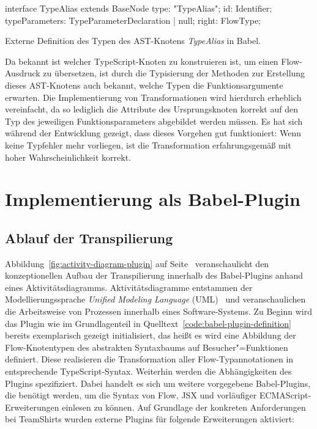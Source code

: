 \bigbreak
\begin{listing}[htb]
\begin{textcode}
interface TypeAlias extends BaseNode {
  type: "TypeAlias";
  id: Identifier;
  typeParameters: TypeParameterDeclaration | null;
  right: FlowType;
}
\end{textcode}
\listingvspace
\caption{Externe Definition des Typen des AST-Knotens \textit{TypeAlias} in Babel.}
\label{code:babel:static-types}
\end{listing}

Da bekannt ist welcher TypeScript-Knoten zu konstruieren ist, um einen Flow-Ausdruck zu übersetzen, ist durch die Typisierung der Methoden zur Erstellung dieses AST-Knotens auch bekannt, welche Typen die Funktionsargumente erwarten. Die Implementierung von Transformationen wird hierdurch erheblich vereinfacht, da so lediglich die Attribute des Ursprungsknoten korrekt auf den Typ des jeweiligen Funktionsparameters abgebildet werden müssen. Es hat sich während der Entwicklung gezeigt, dass dieses Vorgehen gut funktioniert: Wenn keine Typfehler mehr vorliegen, ist die Transformation erfahrungsgemäß mit hoher Wahrscheinlichkeit korrekt.

\section{Implementierung als Babel-Plugin}

\subsection{Ablauf der Transpilierung}


Abbildung~\ref{fig:activity-diagram-plugin} auf Seite~\pageref{fig:activity-diagram-plugin} veranschaulicht den konzeptionellen Aufbau der Transpilierung innerhalb des Babel-Plugins anhand eines Aktivitätsdiagramms. Aktivitätsdiagramme entstammen der Modellierungssprache \textit{Unified Modeling Language} (UML)~\autocite{OMG:UML} und veranschaulichen die Arbeitsweise von Prozessen innerhalb eines Software-Systems. Zu Beginn wird das Plugin wie im Grundlagenteil in Quelltext~\ref{code:babel-plugin-definition} bereits exemplarisch gezeigt initialisiert, das heißt es wird eine Abbildung der Flow-Knotentypen des abstrakten Syntaxbaums auf Besucher"=Funktionen definiert. Diese realisieren die Transformation aller Flow-Typannotationen in entsprechende TypeScript-Syntax.
Weiterhin werden die Abhängigkeiten des Plugins spezifiziert. Dabei handelt es sich um weitere vorgegebene Babel-Plugins, die benötigt werden, um die Syntax von Flow, JSX und vorläufiger ECMAScript-Erweiterungen einlesen zu können. Auf Grundlage der konkreten Anforderungen bei TeamShirts wurden externe Plugins für folgende Erweiterungen aktiviert:

